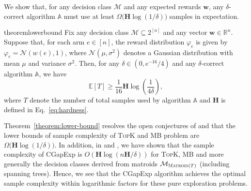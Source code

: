 \documentclass{article}
\newcommand{\Algorithm}{{\small \textsf{CGapExp}}\xspace}
\newcommand{\Rew}{\varphi}
\newcommand{\E}{\mathbb E}
\newcommand{\M}{\mathcal M}
\newcommand{\B}{\mathcal B}
\newcommand{\RR}{\mathbb R}
\DeclareMathOperator{\rank}{width}
\newcommand{\MultiIdent}{\textsc{TopK}\xspace}
\newcommand{\MultiBandit}{\textsc{MB}\xspace}
\newcommand{\Matroid}{\textsc{Matroid}\xspace}
\newcommand{\Match}{\textsc{Match}\xspace}
\newcommand{\Path}{\textsc{Path}\xspace}
\renewcommand{\vec}[1]{\boldsymbol{#1}}
\begin{document}
We show that, for any decision class $\M$ and any expected rewards $\vec w$, any $\delta$-correct algorithm $\mathbb A$ must use at least $\Omega\big(\mathbf H \log(1/\delta) \big)$ samples in expectation.
\begin{restatable}{theorem}{lowerbound}
Fix any decision class $\M\subseteq 2^{[n]}$ and any vector $\vec w \in \RR^n$.
Suppose that, for each arm $e\in [n]$, the reward distribution $\Rew_e$ is given by $\Rew_e=\mathcal N(w(e),1)$, where $\mathcal N(\mu, \sigma^2)$ denotes a Gaussian distribution with mean $\mu$ and variance $\sigma^2$. 
Then, for any $\delta \in (0,e^{-16}/4)$ and any $\delta$-correct algorithm $\mathbb A$, we have
\begin{equation}
\label{eq:lower-bound}
\E[T] \ge \frac{1}{16} \mathbf H \log\left(\frac{1}{4\delta}\right),
\end{equation}
where 
$T$ denote the number of total samples used by algorithm $\mathbb A$ and
$\mathbf H$ is defined in Eq.~\eqref{eq:hardness}.
\label{theorem:lower-bound}
\end{restatable}

Theorem~\ref{theorem:lower-bound} resolves  the open conjectures of \citet{kalyanakrishnan2012pac} and \citet{bubeck2013multiple} that the lower bounds of sample complexity of \MultiIdent and \MultiBandit problem are $\Omega\big(\mathbf H\log(1/\delta)\big)$.
In addition, in  and , we have shown that the sample complexity of \Algorithm is $O(\mathbf H\log(n\mathbf H/\delta))$ for \MultiIdent, \MultiBandit and more generally the decision classes derived from matroids $\M_{\Matroid(T)}$ (including spanning trees).
Hence, we see that the \Algorithm algorithm achieves the optimal sample complexity within logarithmic factors for these pure exploration problems.
\end{document}
